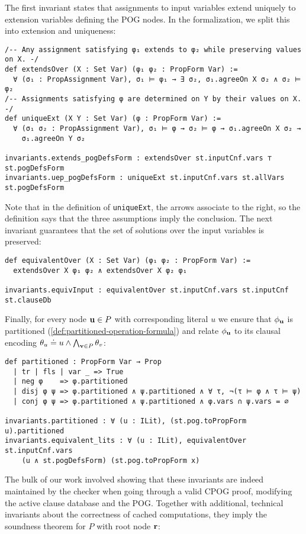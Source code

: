 The first invariant states that assignments to input variables
extend uniquely to extension variables defining the POG nodes.
In the formalization, we split this into extension and uniqueness:
\begin{lstlisting}
/-- Any assignment satisfying φ₁ extends to φ₂ while preserving values on X. -/
def extendsOver (X : Set Var) (φ₁ φ₂ : PropForm Var) :=
  ∀ (σ₁ : PropAssignment Var), σ₁ ⊨ φ₁ → ∃ σ₂, σ₁.agreeOn X σ₂ ∧ σ₂ ⊨ φ₂
/-- Assignments satisfying φ are determined on Y by their values on X. -/
def uniqueExt (X Y : Set Var) (φ : PropForm Var) :=
  ∀ (σ₁ σ₂ : PropAssignment Var), σ₁ ⊨ φ → σ₂ ⊨ φ → σ₁.agreeOn X σ₂ →
    σ₁.agreeOn Y σ₂

invariants.extends_pogDefsForm : extendsOver st.inputCnf.vars ⊤ st.pogDefsForm
invariants.uep_pogDefsForm : uniqueExt st.inputCnf.vars st.allVars st.pogDefsForm
\end{lstlisting}
Note that in the definition of \lstinline{uniqueExt}, the arrows associate to the right,
so the definition says that the three assumptions imply the conclusion.
The next invariant guarantees that the set of solutions over the input variables is preserved:
\begin{lstlisting}
def equivalentOver (X : Set Var) (φ₁ φ₂ : PropForm Var) :=
  extendsOver X φ₁ φ₂ ∧ extendsOver X φ₂ φ₁

invariants.equivInput : equivalentOver st.inputCnf.vars st.inputCnf st.clauseDb
\end{lstlisting}
Finally, for every node $\mathbf{u}\in P$ with corresponding literal $u$ we ensure that $\phi_{\mathbf{u}}$ is partitioned (\ref{def:partitioned-operation-formula}) and relate $\phi_{\mathbf{u}}$ to its clausal encoding $\theta_u \doteq u \wedge \bigwedge_{\mathbf{v}\in P}\theta_v$:
\begin{lstlisting}
def partitioned : PropForm Var → Prop
  | tr | fls | var _ => True
  | neg φ    => φ.partitioned
  | disj φ ψ => φ.partitioned ∧ ψ.partitioned ∧ ∀ τ, ¬(τ ⊨ φ ∧ τ ⊨ ψ)
  | conj φ ψ => φ.partitioned ∧ ψ.partitioned ∧ φ.vars ∩ ψ.vars = ∅

invariants.partitioned : ∀ (u : ILit), (st.pog.toPropForm u).partitioned
invariants.equivalent_lits : ∀ (u : ILit), equivalentOver st.inputCnf.vars
    (u ∧ st.pogDefsForm) (st.pog.toPropForm x)
\end{lstlisting}

The bulk of our work involved showing
that these invariants are indeed maintained by the checker
when going through a valid CPOG proof,
modifying the active clause database and the POG.
Together with additional, technical invariants
about the correctness of cached computations,
they imply the soundness theorem for $P$ with root node $\mathbf{r}$:

